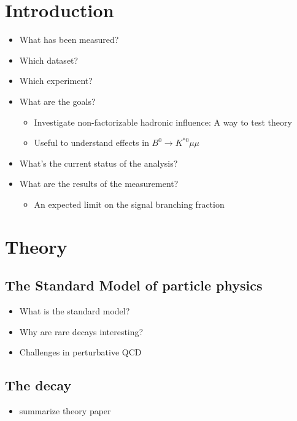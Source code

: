 
\chapter{Introduction} %

\begin{itemize}
  \item What has been measured?
  \item Which dataset?
  \item Which experiment?
  \item What are the goals? 
    \begin{itemize}
      \item Investigate non-factorizable hadronic influence: A way to test theory
      \item Useful to understand effects in $B^0\to K^{*0}\mu\mu$
    \end{itemize}
  \item What's the current status of the analysis?
  \item What are the results of the measurement?
    \begin{itemize}
      \item An expected limit on the signal branching fraction
    \end{itemize}
\end{itemize}

\chapter{Theory} %

\section{The Standard Model of particle physics}

\begin{itemize}
  \item What is the standard model?
  \item Why are rare decays interesting?
  \item Challenges in perturbative QCD
\end{itemize}

\section[The decay \decay]{The decay \bolddecay}

\begin{itemize}
  \item summarize theory paper
\end{itemize}

